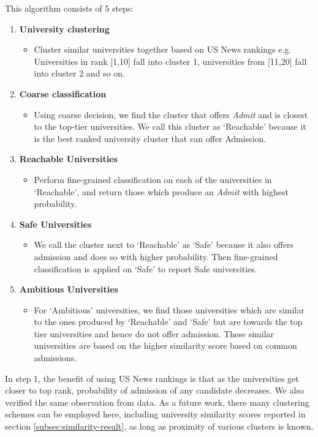\documentclass{sig-alternate-05-2015}
\begin{document}
This algorithm consists of 5 steps:
\begin {enumerate}
\item \textbf{University clustering}
	\begin {itemize}
	\item Cluster similar universities together based on US News rankings e.g. Universities in rank [1,10] fall into cluster 1, universities from [11,20] fall into cluster 2 and so on. 
	\end {itemize}
\item \textbf {Coarse classification}
	\begin {itemize}
	\item Using coarse decision, we find the cluster that offers \textit{Admit} and is closest to the top-tier universities. We call this cluster as `Reachable' because it is the best ranked university cluster that can offer Admission.
	\end {itemize}
\item \textbf {Reachable Universities}
	\begin {itemize}
	\item Perform fine-grained classification on each of the universities in `Reachable', and return those which produce an \textit{Admit} with highest probability.
	\end {itemize}
\item \textbf {Safe Universities}
	\begin {itemize}
	\item We call the cluster next to `Reachable' as `Safe' because it also offers admission and does so with higher probability. Then fine-grained classification is applied on `Safe' to report Safe universities.
	\end {itemize}
\item \textbf {Ambitious Universities}
	\begin {itemize}
	\item For `Ambitious' universities, we find those universities which are similar to the ones produced by `Reachable' and `Safe' but are towards the top tier universities and hence do not offer admission. These similar universities are based on the higher similarity score based on common admissions.
	\end {itemize}
\end {enumerate}

In step 1, the benefit of using US News rankings is that as the universities get closer to top rank, probability of admission of any candidate decreases. We also verified the same observation from data. As a future work, there many clustering schemes can be employed here, including university similarity scores reported in section \ref{subsec:similarity-result}, as long as proximity of various clusters is known.
\end{document}
